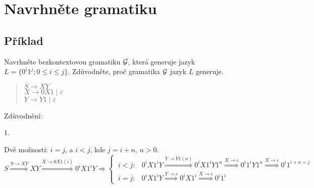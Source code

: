 \begin{multicols}{2}
        
        
\end{multicols}  

\section*{Navrhněte gramatiku}
\subsection{Příklad}
\noindent
Navrhněte bezkontextovou gramatiku $\mathcal{G}$, která generuje jazyk $L = \{0^i1^j ; 0 \leq i \leq j\}$.
Zdůvodněte, proč gramatika $\mathcal{G}$ jazyk $L$ generuje.
    
\begin{quote}
    $S \rightarrow XY$\\
    $X \rightarrow 0X1 \mid \varepsilon$\\
    $Y \rightarrow Y1 \mid \varepsilon$\\
\end{quote}

Zdůvodnění: 

1. 

Dvě možnosti: $ i = j$, a $i < j$, kde $j = i + n$, $n > 0$. 
\[
    S \stackrel{S \rightarrow XY}{\Longrightarrow} XY \stackrel{X \rightarrow 0X1 (i)}{\Longrightarrow} 0^i X 1^i Y  
    \Longrightarrow
\begin{cases}
    \ i < j:  & 0^i X 1^i Y \stackrel {Y \rightarrow Y1 (n)}{\Longrightarrow} 0^i X 1^i Y 1^n \stackrel{X \rightarrow 
    \varepsilon}{\Longrightarrow}0^i 1^i Y 1^n \stackrel{X \rightarrow \varepsilon}{\Longrightarrow} 0^i 1^{i+n = j} \\
    \ i = j: & 0^i X 1^i Y \stackrel{Y \rightarrow \varepsilon}{\Longrightarrow} 0^i X 1^i \stackrel{X \rightarrow 
    \varepsilon}{\Longrightarrow} 0^i 1^i
\end{cases}
\]

